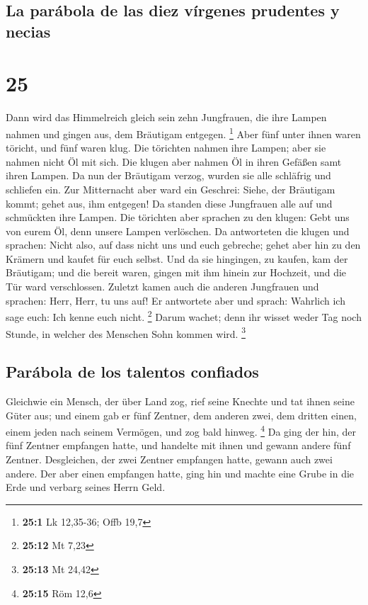 \hypertarget{la-paruxe1bola-de-las-diez-vuxedrgenes-prudentes-y-necias}{%
\subsection{La parábola de las diez vírgenes prudentes y
necias}\label{la-paruxe1bola-de-las-diez-vuxedrgenes-prudentes-y-necias}}

\hypertarget{section-24}{%
\section{25}\label{section-24}}

 Dann wird das Himmelreich gleich sein zehn Jungfrauen,
die ihre Lampen nahmen und gingen aus, dem Bräutigam entgegen.
\footnote{\textbf{25:1} Lk 12,35-36; Offb 19,7}  Aber fünf
unter ihnen waren töricht, und fünf waren klug.  Die
törichten nahmen ihre Lampen; aber sie nahmen nicht Öl mit sich.
 Die klugen aber nahmen Öl in ihren Gefäßen samt ihren
Lampen.  Da nun der Bräutigam verzog, wurden sie alle
schläfrig und schliefen ein.  Zur Mitternacht aber ward
ein Geschrei: Siehe, der Bräutigam kommt; gehet aus, ihm entgegen!
 Da standen diese Jungfrauen alle auf und schmückten ihre
Lampen.  Die törichten aber sprachen zu den klugen: Gebt
uns von eurem Öl, denn unsere Lampen verlöschen.  Da
antworteten die klugen und sprachen: Nicht also, auf dass nicht uns und
euch gebreche; gehet aber hin zu den Krämern und kaufet für euch selbst.
 Und da sie hingingen, zu kaufen, kam der Bräutigam; und
die bereit waren, gingen mit ihm hinein zur Hochzeit, und die Tür ward
verschlossen.  Zuletzt kamen auch die anderen Jungfrauen
und sprachen: Herr, Herr, tu uns auf!  Er antwortete aber
und sprach: Wahrlich ich sage euch: Ich kenne euch nicht. \footnote{\textbf{25:12}
  Mt 7,23}  Darum wachet; denn ihr wisset weder Tag noch
Stunde, in welcher des Menschen Sohn kommen wird. \footnote{\textbf{25:13}
  Mt 24,42}

\hypertarget{paruxe1bola-de-los-talentos-confiados}{%
\subsection{Parábola de los talentos
confiados}\label{paruxe1bola-de-los-talentos-confiados}}

 Gleichwie ein Mensch, der über Land zog, rief seine
Knechte und tat ihnen seine Güter aus;  und einem gab er
fünf Zentner, dem anderen zwei, dem dritten einen, einem jeden nach
seinem Vermögen, und zog bald hinweg. \footnote{\textbf{25:15} Röm 12,6}
 Da ging der hin, der fünf Zentner empfangen hatte, und
handelte mit ihnen und gewann andere fünf Zentner. 
Desgleichen, der zwei Zentner empfangen hatte, gewann auch zwei andere.
 Der aber einen empfangen hatte, ging hin und machte eine
Grube in die Erde und verbarg seines Herrn Geld.

